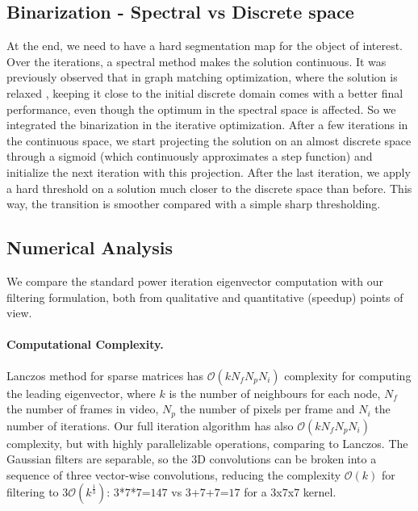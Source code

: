 \documentclass{article}
\begin{document}
\subsection{Binarization - Spectral vs Discrete space}
\label{subsec: binarization}
At the end, we need to have a hard segmentation map for the object of interest. Over the iterations, a spectral method makes the solution continuous. It was previously observed that in graph matching optimization, where the solution is relaxed \cite{ipfp}, keeping it close to the initial discrete domain comes with a better final performance, even though the optimum in the spectral space is affected. So we integrated the binarization in the iterative optimization.
After a few iterations in the continuous space, we start projecting the solution on an almost discrete space through a sigmoid (which continuously approximates a step function) and initialize the next iteration with this projection. After the last iteration, we apply a hard threshold on a solution much closer to the discrete space than before. This way, the transition is smoother compared with a simple sharp thresholding. 




\subsection{Numerical Analysis}
\label{subsec: numerical_complexity}
We compare the standard power iteration eigenvector computation with our filtering formulation, both from qualitative and quantitative (speedup) points of view.

\paragraph{Computational Complexity.} Lanczos  method for sparse matrices has $\mathcal{O}(k N_f N_p N_i)$ complexity for computing the leading eigenvector,
where $k$ is the number of neighbours for each node, $N_f$ the number of frames in video, $N_p$ the number of pixels per frame and $N_i$ the number of iterations. Our full iteration algorithm has also $\mathcal{O}(k N_f N_p N_i)$ complexity, but with highly parallelizable operations, comparing to Lanczos.  The Gaussian filters are separable, so the 3D convolutions can be broken into a sequence of three vector-wise convolutions, reducing the complexity $\mathcal{O}(k)$ for filtering to $3 \mathcal{O}(k^{\frac{1}{3}})$: $3$*$7$*$7$=$147$ vs $3$+$7$+$7$=$17$ for a $3$x$7$x$7$ kernel.
\end{document}
